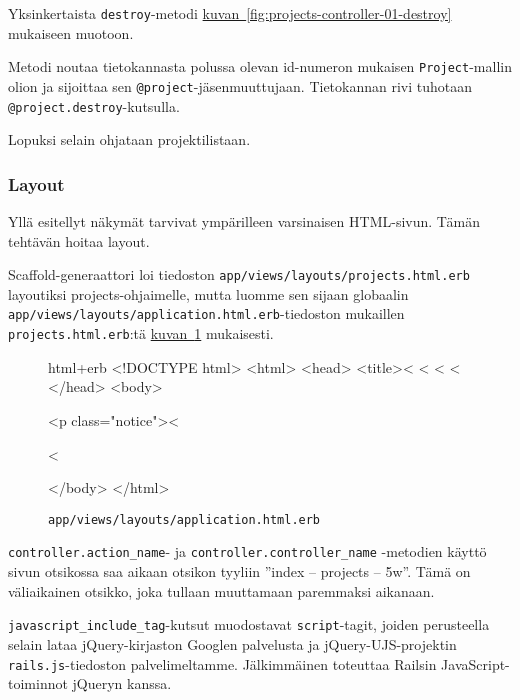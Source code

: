 \documentclass{article}
\newenvironment{myfigure}[1][tbp]{
  \begin{figure}[#1]
    \centering
    \begin{lrbox}{\myfigurebox}
      \begin{minipage}{\textwidth}
}{
      \end{minipage}
    \end{lrbox}
    \colorbox{blue!4}{\usebox{\myfigurebox}}
  \end{figure}
}
\newcommand{\myref}[2]{\hyperref[#2]{#1~\ref*{#2}}}
\newcommand{\pdfforeignlanguage}[2]{\texorpdfstring{\foreignlanguage{#1}{#2}}{#2}}
\newcommand{\eng}[1]{\pdfforeignlanguage{english}{#1}}
\begin{document}
Yksinkertaista \texttt{destroy}-metodi
\myref{kuvan}{fig:projects-controller-01-destroy} mukaiseen muotoon.

Metodi noutaa tietokannasta polussa olevan id-numeron mukaisen
\texttt{Project}-mallin olion ja sijoittaa sen
\texttt{@project}-jäsenmuuttujaan. Tietokannan rivi tuhotaan
\texttt{@project.destroy}-kutsulla.

Lopuksi selain ohjataan projektilistaan.

\subsubsection{\eng{Layout}}

Yllä esitellyt näkymät tarvivat ympärilleen varsinaisen HTML-sivun. Tämän
tehtävän hoitaa \eng{layout}.

\begin{samepage}
\eng{Scaffold}-generaattori loi tiedoston
\texttt{app/views/layouts/projects.html.erb} layoutiksi projects-ohjaimelle,
mutta luomme sen sijaan globaalin
\texttt{app/views/layouts/application.html.erb}-tiedoston mukaillen
\texttt{projects.html.erb}:tä \myref{kuvan}{fig:application-layout-00}
mukaisesti.

\begin{myfigure}[H]
\caption{\texttt{app/views/layouts/application.html.erb}}
\label{fig:application-layout-00}

\begin{pygmented}{html+erb}
<!DOCTYPE html>
<html>
<head>
  <title><%
  <%
  <%
  <%
</head>
<body>

<p class="notice"><%

<%

</body>
</html>
\end{pygmented}
\end{myfigure}
\end{samepage}

\texttt{controller.action\_name}- ja \texttt{controller.controller\_name}
-metodien käyttö sivun otsikossa saa aikaan otsikon tyyliin ''index -- projects
-- 5w''. Tämä on väliaikainen otsikko, joka tullaan muuttamaan paremmaksi
aikanaan.

\texttt{javascript\_include\_tag}-kutsut muodostavat \texttt{script}-tagit,
joiden perusteella selain lataa jQuery-kirjaston Googlen palvelusta ja
jQuery-UJS-projektin \texttt{rails.js}-tiedoston palvelimeltamme. Jälkimmäinen
toteuttaa Railsin JavaScript-toiminnot jQueryn kanssa.
\end{document}
